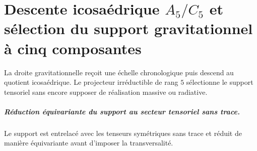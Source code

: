 \chapter{Descente icosaédrique \texorpdfstring{\(A_5/C_5\)}{A₅/C₅} et sélection du support gravitationnel à cinq composantes}
\label{chap:parte-iv-63}

La droite gravitationnelle reçoit une échelle chronologique puis descend au quotient icosaédrique. Le projecteur irréductible de rang \(5\) sélectionne le support tensoriel sans encore supposer de réalisation massive ou radiative.



\paragraph{Réduction équivariante du support au secteur tensoriel sans trace.} Le support est entrelacé avec les tenseurs symétriques sans trace et réduit de manière équivariante avant d’imposer la transversalité.
